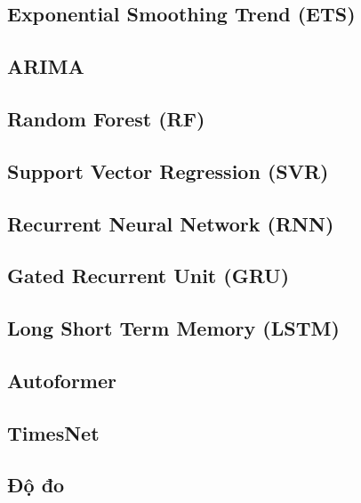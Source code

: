 \documentclass[conference]{IEEEtran}
\begin{document}
\subsection{Exponential Smoothing Trend (ETS)}


\subsection{ARIMA}


\subsection{Random Forest (RF)}


\subsection{Support Vector Regression (SVR)}


\subsection{Recurrent Neural Network (RNN)}


\subsection{Gated Recurrent Unit (GRU)}


\subsection{Long Short Term Memory (LSTM)}


\subsection{Autoformer}


\subsection{TimesNet}


\subsection{Độ đo}

\hfill\\
\end{document}
